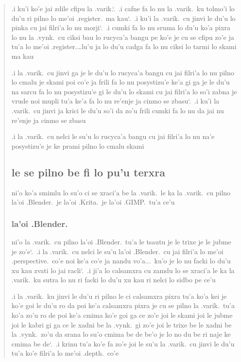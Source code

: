\documentclass{report}
\newcommand\sds{\spacefactor\sfcode`.\ \space}
\begin{document}
\begin{quote}
	.i ku'i ko'e jai zdile cfipu la .varik.\sds  .i cafne fa lo nu la .varik.\ ku tolmo'i lo du'u ri pilno lo me'oi .register.\ ma kau\sds  .i ku'i la .varik.\ cu jinvi le du'u lo pinka cu jai filri'a lo nu morji\sds  .i cumki fa lo nu sruma lo du'u ko'a pixra lo nu la .vynk.\ cu ciksi bau lo rucyca'a bangu pe ko'e je cu se cfipu zo'e ja tu'a lo me'oi .register.\ldots lu'u ja lo du'u cadga fa lo nu ciksi lo tarmi lo skami ma kau

	.i la .varik.\ cu jinvi ga je le du'u lo rucyca'a bangu cu jai filri'a lo nu pilno lo cmalu je skami poi co'e ja frili fa lo nu posystizu'e ke'a gi ga je le du'u na sarcu fa lo nu posystizu'e gi le du'u lo skami cu jai filri'a lo so'i zabna je vrude noi mupli tu'a ke'a fa lo nu re'enje ja cinmo se zbasu\sds  .i ku'i la .varik.\ cu jinvi ja krici le du'u so'i da zo'u frili cumki fa lo nu da jai nu re'enje ja cinmo se zbasu

	.i la .varik.\ cu nelci le su'u lo rucyca'a bangu cu jai filri'a lo nu na'e posystizu'e je ke prami pilno lo cmalu skami

	\subsection{le se pilno be fi lo pu'u terxra}
	ni'o ko'a smimlu lo su'o ci se xraci'a be la .varik.\ le ka la .varik.\ cu pilno la'oi .Blender.\ je la'oi .Krita.\ je la'oi .GIMP.\ tu'a ce'u

	\subsubsection{la'oi .Blender.}
	ni'o la .varik.\ cu pilno la'oi .Blender.\ tu'a le tsautu je le trixe je le jubme je zo'e\sds  .i la .varik.\ cu nelci le su'u la'oi .Blender.\ cu jai filri'a lo me'oi .perspective.\ co'e noi ke'a co'e ja nandu vo'a...\ ku'o je lo nu facki lo du'u xu kau zvati lo jai racli\sds  .i ji'a lo calsamxra cu zamdu lo se xraci'a le ka la .varik.\ ku sutra lo nu ri facki lo du'u xu kau ri nelci lo sidbo pe ce'u

	.i la .varik.\ ku jinvi le du'u ri pilno le ci calsamxra pixra tu'a ko'a kei je ko'e goi le du'u ro da poi ke'a calsamxra pixra je cu se pilno la .varik.\ tu'a ko'a zo'u ro de poi ke'a cmima ko'e goi ga ce zo'e joi le skami joi le jubme joi le kabri gi ga ce le xadni be la .vynk.\ gi zo'e joi le trixe be le xadni be la .vynk.\ zo'u da srana lo su'o cmima be de be'o je lo no du be ri naje ke cmima be de\sds  .i krinu tu'a ko'e fa zo'e joi le su'u la .varik.\ cu jinvi le du'u tu'a ko'e filri'a lo me'oi .depth.\ co'e


\end{quote}
\end{document}
